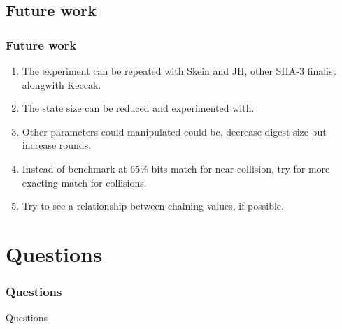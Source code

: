 \documentclass{beamer}
\begin{document}
\subsection{Future work}

\begin{frame}
\frametitle{Future work}
\begin{enumerate}
\item The experiment can be repeated with Skein and JH, other SHA-3 finalist alongwith Keccak.
\item The state size can be reduced and experimented with.
\item Other parameters could manipulated could be, decrease digest size but increase rounds.
\item Instead of benchmark at 65\% bits match for near collision, try for more exacting match
for collisions.
\item Try to see a relationship between chaining values, if possible.
\end{enumerate}
\end{frame}

\section{Questions}

\begin{frame}
\frametitle{Questions}
Questions
\end{frame}
\end{document}
